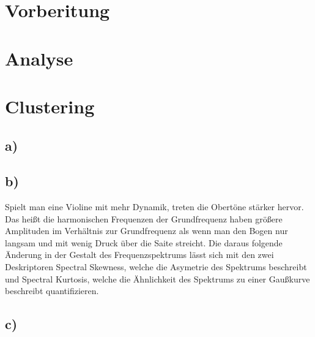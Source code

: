 

\section{Vorberitung}
\label{sec:preperation}





\section{Analyse}
\label{sec:analyse}




\section{Clustering}
\label{sec:cluster}
\subsection{a)}
\subsection{b)}
Spielt man eine Violine mit mehr Dynamik, treten die Obertöne stärker hervor.
Das heißt die harmonischen Frequenzen der Grundfrequenz haben größere Amplituden im Verhältnis zur Grundfrequenz als wenn man den Bogen nur langsam und mit wenig Druck über die Saite streicht.  
Die daraus folgende Änderung in der Gestalt des Frequenzspektrums lässt sich mit den zwei Deskriptoren Spectral Skewness, welche die Asymetrie des Spektrums beschreibt und Spectral Kurtosis, welche die Ähnlichkeit des Spektrums zu einer Gaußkurve beschreibt quantifizieren. 

\subsection{c)}


\subsection{}

